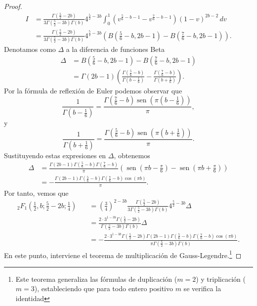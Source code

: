\documentclass[12pt,a4paper]{book}
\renewcommand{\sin}{\operatorname{sen}}
\begin{document}
\begin{proof}
\begin{align*}
    I &= \frac{\Gamma(\frac{5}{2}-2b)}{3\Gamma(\frac{5}{2}-3b)\Gamma(b)} 4^{\frac{5}{2}-3b} \int_{0}^{1} \left(v^{\frac{5}{6}-b-1} - v^{\frac{7}{6}-b-1}\right) (1-v)^{2b-2} \, dv \\
    &= \frac{\Gamma(\frac{5}{2}-2b)}{3\Gamma(\frac{5}{2}-3b)\Gamma(b)} 4^{\frac{5}{2}-3b} \left( B\left(\frac{5}{6}-b, 2b-1\right) - B\left(\frac{7}{6}-b, 2b-1\right) \right).
\end{align*}
Denotamos como $\Delta$ a la diferencia de funciones Beta 
\begin{align*}
    \Delta &=  B\left(\frac{5}{6}-b, 2b-1\right) - B\left(\frac{7}{6}-b, 2b-1\right)\\
    &= \Gamma(2b-1) \left( \frac{\Gamma\left(\frac{5}{6}-b\right)}{\Gamma\left(b-\frac{1}{6}\right)} - \frac{\Gamma\left(\frac{7}{6}-b\right)}{\Gamma\left(b+\frac{1}{6}\right)} \right).
\end{align*}
Por la fórmula de reflexión de Euler podemos observar que
\[
    \frac{1}{\Gamma\left(b-\frac{1}{6}\right)} = \frac{\Gamma\left(\frac{7}{6}-b\right) \sin\left(\pi\left(b-\frac{1}{6}\right)\right)}{\pi},
\]
y
\[
    \frac{1}{\Gamma\left(b+\frac{1}{6}\right)} = \frac{\Gamma\left(\frac{5}{6}-b\right) \sin\left(\pi\left(b+\frac{1}{6}\right)\right)}{\pi}.
\]
Sustituyendo estas expresiones en $\Delta$, obtenemos
\begin{align*}
        \Delta &= \frac{\Gamma(2b-1)\Gamma\left(\frac{5}{6}-b\right)\Gamma\left(\frac{7}{6}-b\right)}{\pi} \left( \sin\left(\pi b - \frac{\pi}{6}\right) - \sin\left(\pi b + \frac{\pi}{6}\right) \right) \\
        &= -\frac{\Gamma(2b-1)\Gamma\left(\frac{5}{6}-b\right)\Gamma\left(\frac{7}{6}-b\right) \cos(\pi b)}{\pi}.
\end{align*}
Por tanto, vemos que
\begin{align*}
    {}_{2}F_{1}\left(\frac{1}{2}, b; \frac{5}{2}-2b; \frac{1}{4}\right)
    &\quad = \left(\frac{3}{4}\right)^{2-3b} \frac{\Gamma\left(\frac{5}{2}-2b\right)}{3\Gamma\left(\frac{5}{2}-3b\right)\Gamma(b)} 4^{\frac{5}{2}-3b} \Delta \\
    &\quad = \frac{2 \cdot 3^{1-3b} \Gamma\left(\frac{5}{2}-2b\right)}{\Gamma\left(\frac{5}{2}-3b\right)\Gamma(b)} \Delta \\
    &\quad = -\frac{2 \cdot 3^{1-3b} \Gamma\left(\frac{5}{2}-2b\right) \Gamma(2b-1) \Gamma\left(\frac{5}{6}-b\right)\Gamma\left(\frac{7}{6}-b\right) \cos(\pi b)}{\pi \Gamma\left(\frac{5}{2}-3b\right)\Gamma(b)}.
\end{align*}
En este punto, interviene el teorema de multiplicación de Gauss-Legendre.\footnote{Este teorema generaliza las fórmulas de duplicación ($m=2$) y triplicación ($m=3$), estableciendo que para todo entero positivo $m$ se verifica la identidad 
}
\end{proof}
\end{document}
